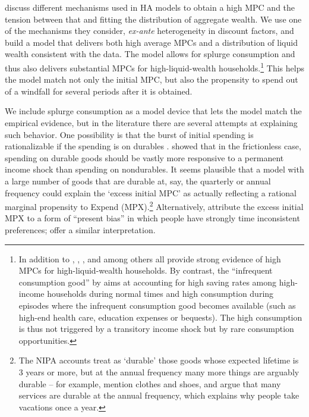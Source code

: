 \documentclass[\econtexRoot/HAFiscal]{subfiles}
\begin{document}
\cite{kaplanMPC2022} discuss different mechanisms used in HA models to obtain a high MPC and the tension between that and fitting the distribution of aggregate wealth. We use one of the mechanisms they consider, \textit{ex-ante} heterogeneity in discount factors, and build a model that delivers both high average MPCs and a distribution of liquid wealth consistent with the data. The model allows for splurge consumption and thus also delivers substantial MPCs for high-liquid-wealth households.\footnote{In addition to \cite{fagereng_mpc_2021}, \cite{graham2024mental}, \cite{crawley2023MicroMacro}, and \cite{kueng2018excess} among others all provide strong evidence of high MPCs for high-liquid-wealth households. By contrast, the ``infrequent consumption good'' by \citet{melcangiStock} aims at accounting for high saving rates among high-income households during normal times and high consumption during episodes where the infrequent consumption good becomes available (such as high-end health care, education expenses or bequests). The high consumption is thus not triggered by a transitory income shock but by rare consumption opportunities.} This helps the model match not only the initial MPC, but also the propensity to spend out of a windfall for several periods after it is obtained.

We include splurge consumption as a model device that lets the model match the empirical evidence, but in the literature there are several attempts at explaining such behavior. One possibility is that the burst of initial spending is rationalizable if the spending is on durables \citep{bcShocksStocks}.  \cite{mankiw:durgoods} showed that in the frictionless case, spending on durable goods should be vastly more responsive to a permanent income shock than spending on nondurables. It seems plausible that a model with a large number of goods that are durable at, say, the quarterly or annual frequency could explain the `excess initial MPC' as actually reflecting a rational marginal propensity to Expend (MPX).\footnote{The NIPA accounts treat as `durable' those goods whose expected lifetime is 3 years or more, but at the annual frequency many more things are arguably durable -- for example, \cite{bdTimeSeriesC} mention clothes and shoes, and \cite{hkpMemorable} argue that many services are durable at the annual frequency, which explains why people take vacations once a year.} Alternatively, \cite{indarte2024explains} attribute the excess initial MPX to a form of ``present bias'' in which people have strongly time inconsistent preferences; \cite{lmmPresentBias} offer a similar interpretation. 
\end{document}
